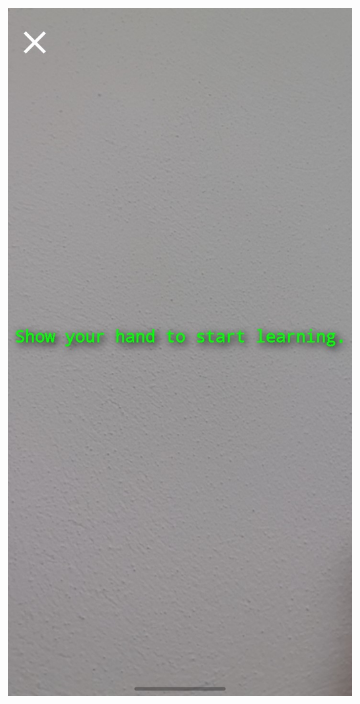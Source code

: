 \begin{figure}[H]
  \centering
    \begin{subfigure}{0.2\textwidth}
    \includegraphics[width=\textwidth]{images/3-aplicatia-android/start_learn_screen.jpeg}
  \caption{}

\end{subfigure}
\end{figure}
